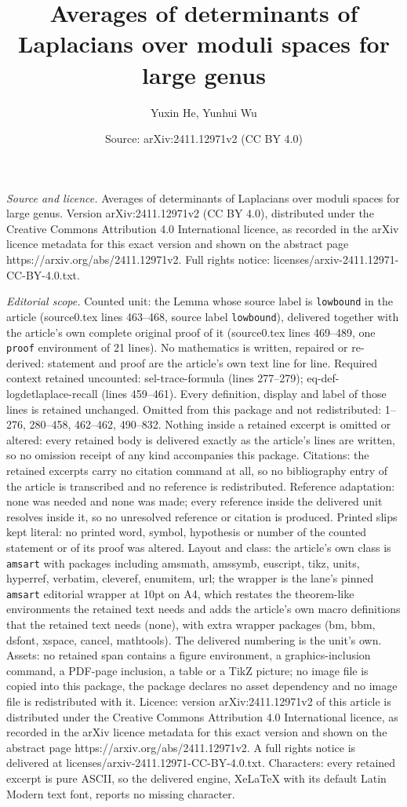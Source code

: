 \documentclass[10pt,a4paper]{amsart}
\title[Averages of determinants of Laplacians over moduli spaces fo]{Averages of determinants of Laplacians over moduli spaces for large genus}
\author{Yuxin He, Yunhui Wu}
\date{Source: arXiv:2411.12971v2 (CC BY 4.0)}
\begin{document}
\maketitle

\noindent\emph{Source and licence.} Averages of determinants of Laplacians over moduli spaces for large genus. Version arXiv:2411.12971v2 (CC BY 4.0), distributed under the Creative Commons Attribution 4.0 International licence, as recorded in the arXiv licence metadata for this exact version and shown on the abstract page https://arxiv.org/abs/2411.12971v2. Full rights notice: licenses/arxiv-2411.12971-CC-BY-4.0.txt.\par\smallskip

\noindent\textit{Editorial scope.} Counted unit: the Lemma whose source label is \texttt{lowbound} in the article (source0.tex lines 463--468, source label \texttt{lowbound}), delivered together with the article's own complete original proof of it (source0.tex lines 469--489, one \texttt{proof} environment of 21 lines). No mathematics is written, repaired or re-derived: statement and proof are the article's own text line for line. Required context retained uncounted: sel-trace-formula (lines 277--279); eq-def-logdetlaplace-recall (lines 459--461). Every definition, display and label of those lines is retained unchanged. Omitted from this package and not redistributed: 1--276, 280--458, 462--462, 490--832. Nothing inside a retained excerpt is omitted or altered: every retained body is delivered exactly as the article's lines are written, so no omission receipt of any kind accompanies this package. Citations: the retained excerpts carry no citation command at all, so no bibliography entry of the article is transcribed and no reference is redistributed. Reference adaptation: none was needed and none was made; every reference inside the delivered unit resolves inside it, so no unresolved reference or citation is produced. Printed slips kept literal: no printed word, symbol, hypothesis or number of the counted statement or of its proof was altered. Layout and class: the article's own class is \texttt{amsart} with packages including amsmath, amssymb, euscript, tikz, units, hyperref, verbatim, cleveref, enumitem, url; the wrapper is the lane's pinned \texttt{amsart} editorial wrapper at 10pt on A4, which restates the theorem-like environments the retained text needs and adds the article's own macro definitions that the retained text needs (none), with extra wrapper packages (bm, bbm, dsfont, xspace, cancel, mathtools). The delivered numbering is the unit's own. Assets: no retained span contains a figure environment, a graphics-inclusion command, a PDF-page inclusion, a table or a TikZ picture; no image file is copied into this package, the package declares no asset dependency and no image file is redistributed with it. Licence: version arXiv:2411.12971v2 of this article is distributed under the Creative Commons Attribution 4.0 International licence, as recorded in the arXiv licence metadata for this exact version and shown on the abstract page https://arxiv.org/abs/2411.12971v2. A full rights notice is delivered at licenses/arxiv-2411.12971-CC-BY-4.0.txt. Characters: every retained excerpt is pure ASCII, so the delivered engine, XeLaTeX with its default Latin Modern text font, reports no missing character.
\end{document}
